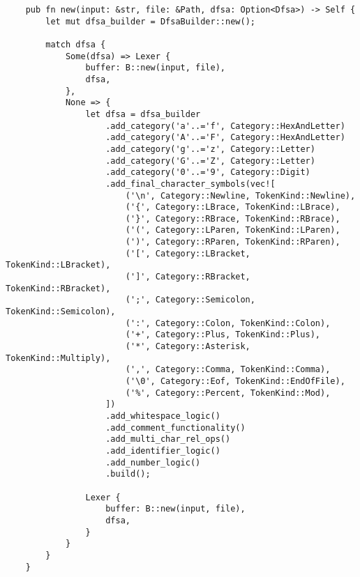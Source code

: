 \documentclass{article}
\begin{document}
\begin{mainbox}{}
    \lstset{xleftmargin=0cm}
    \begin{lstlisting}
    pub fn new(input: &str, file: &Path, dfsa: Option<Dfsa>) -> Self {
        let mut dfsa_builder = DfsaBuilder::new();

        match dfsa {
            Some(dfsa) => Lexer {
                buffer: B::new(input, file),
                dfsa,
            },
            None => {
                let dfsa = dfsa_builder
                    .add_category('a'..='f', Category::HexAndLetter)
                    .add_category('A'..='F', Category::HexAndLetter)
                    .add_category('g'..='z', Category::Letter)
                    .add_category('G'..='Z', Category::Letter)
                    .add_category('0'..='9', Category::Digit)
                    .add_final_character_symbols(vec![
                        ('\n', Category::Newline, TokenKind::Newline),
                        ('{', Category::LBrace, TokenKind::LBrace),
                        ('}', Category::RBrace, TokenKind::RBrace),
                        ('(', Category::LParen, TokenKind::LParen),
                        (')', Category::RParen, TokenKind::RParen),
                        ('[', Category::LBracket, TokenKind::LBracket),
                        (']', Category::RBracket, TokenKind::RBracket),
                        (';', Category::Semicolon, TokenKind::Semicolon),
                        (':', Category::Colon, TokenKind::Colon),
                        ('+', Category::Plus, TokenKind::Plus),
                        ('*', Category::Asterisk, TokenKind::Multiply),
                        (',', Category::Comma, TokenKind::Comma),
                        ('\0', Category::Eof, TokenKind::EndOfFile),
                        ('%', Category::Percent, TokenKind::Mod),
                    ])
                    .add_whitespace_logic()
                    .add_comment_functionality()
                    .add_multi_char_rel_ops()
                    .add_identifier_logic()
                    .add_number_logic()
                    .build();

                Lexer {
                    buffer: B::new(input, file),
                    dfsa,
                }
            }
        }
    }
    \end{lstlisting}
\end{mainbox}




\newpage

\printbibliography
\end{document}
